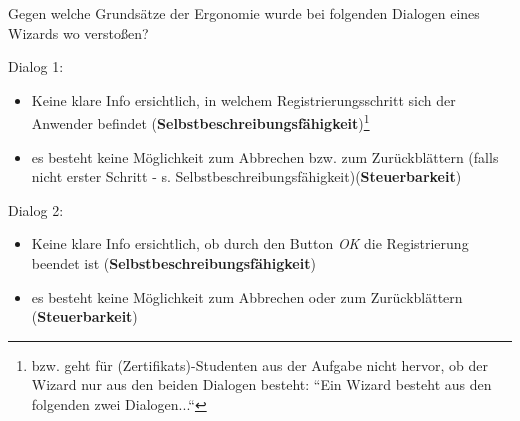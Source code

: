 Gegen welche Grundsätze der Ergonomie wurde bei folgenden Dialogen eines Wizards wo verstoßen?


Dialog 1:

\begin{itemize}
    \item Keine klare Info ersichtlich, in welchem Registrierungsschritt sich der Anwender befindet (\textbf{Selbstbeschreibungsfähigkeit})\footnote{
    bzw. geht für (Zertifikats)-Studenten aus der Aufgabe nicht hervor, ob der Wizard nur aus den beiden Dialogen besteht: ``Ein Wizard besteht aus den folgenden zwei Dialogen...``
    }
    \item es besteht keine Möglichkeit zum Abbrechen bzw. zum Zurückblättern (falls nicht erster Schritt - s. Selbstbeschreibungsfähigkeit)(\textbf{Steuerbarkeit})
\end{itemize}


Dialog 2:
\begin{itemize}
    \item Keine klare Info ersichtlich, ob durch den Button \textit{OK} die Registrierung beendet ist (\textbf{Selbstbeschreibungsfähigkeit})
    \item es besteht keine Möglichkeit zum Abbrechen oder zum Zurückblättern (\textbf{Steuerbarkeit})
\end{itemize}